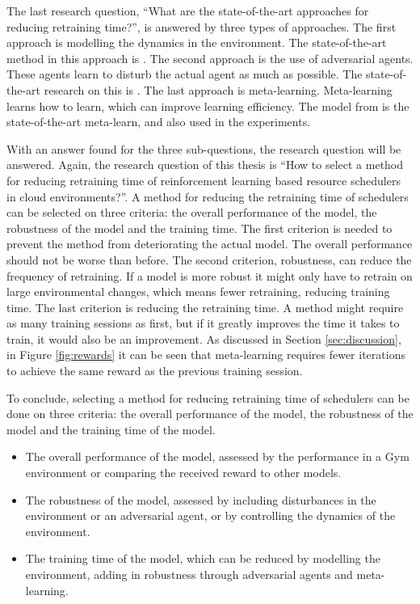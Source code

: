 The last research question, ``What are the state-of-the-art approaches for
reducing retraining time?'', is answered by three types of approaches. The
first approach is modelling the dynamics in the environment. The
state-of-the-art method in this approach is . The second
approach is the use of adversarial agents. These agents learn to disturb the
actual agent as much as possible. The state-of-the-art research on this is
. The last approach is meta-learning. Meta-learning learns how
to learn, which can improve learning efficiency. The \mrlco model from
 is the state-of-the-art meta-learn, and also used in the
experiments.

With an answer found for the three sub-questions, the research question will
be answered. Again, the research question of this thesis is ``How to select a
method for reducing retraining time of reinforcement learning based resource
schedulers in cloud environments?''. A method for reducing the retraining time
of \rlbased schedulers can be selected on three criteria: the overall
performance of the model, the robustness of the model and the training time.
The first criterion is needed to prevent the method from deteriorating the
actual model. The overall performance should not be worse than before. The
second criterion, robustness, can reduce the frequency of retraining. If a
model is more robust it might only have to retrain on large environmental
changes, which means fewer retraining, reducing training time. The last
criterion is reducing the retraining time. A method might require as many
training sessions as first, but if it greatly improves the time it takes to
train, it would also be an improvement. As discussed in Section
\ref{sec:discussion}, in Figure \ref{fig:rewards} it can be seen that
meta-learning requires fewer iterations to achieve the same reward as the
previous training session.

To conclude, selecting a method for reducing retraining time of \rlbased
schedulers can be done on three criteria: the overall performance of the
model, the robustness of the model and the training time of the model.

\begin{itemize}[noitemsep]
    \item The overall performance of the model, assessed by the performance
        in a Gym environment or comparing the received reward to other models.
    \item The robustness of the model, assessed by including disturbances in
        the environment or an adversarial agent, or by controlling the
        dynamics of the environment.
    \item The training time of the model, which can be reduced by modelling
        the environment, adding in robustness through adversarial agents and
        meta-learning.
\end{itemize}
